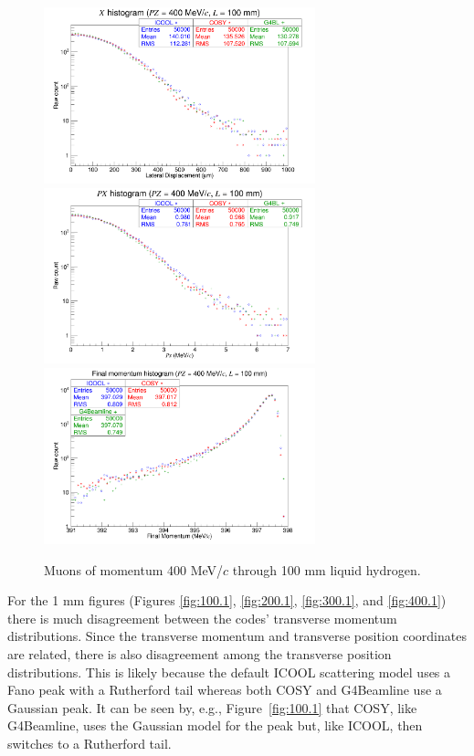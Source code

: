 \begin{figure}[H]
  \centering
    \includegraphics[width=0.7\textwidth]{Benchmarking/LH/X.400.100.png} 
    \includegraphics[width=0.7\textwidth]{Benchmarking/LH/PX.400.100.png} 
    \includegraphics[width=0.7\textwidth]{Benchmarking/LH/strag.400.100.png} 
  \caption{Muons of momentum 400 MeV/$c$ through 100 mm liquid hydrogen.}
  \label{fig:400.100}
\end{figure}


For the 1 mm figures (Figures \ref{fig:100.1}, \ref{fig:200.1}, \ref{fig:300.1}, and \ref{fig:400.1}) there is much disagreement between the codes' transverse momentum distributions. Since the transverse momentum and transverse position coordinates are related, there is also disagreement among the transverse position distributions. This is likely because the default ICOOL scattering model uses a Fano peak with a Rutherford tail whereas both COSY and G4Beamline use a Gaussian peak. It can be seen by, e.g., Figure~\ref{fig:100.1} that COSY, like G4Beamline, uses the Gaussian model for the peak but, like ICOOL, then switches to a Rutherford tail.

